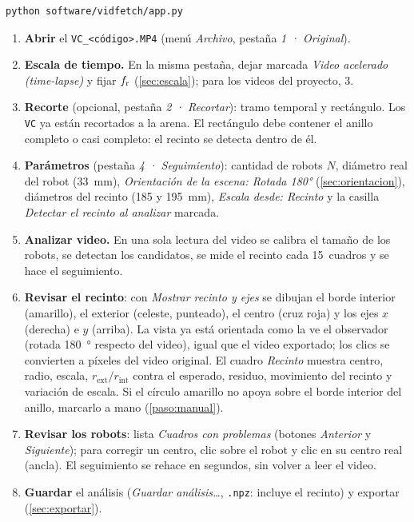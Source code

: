 \begin{verbatim}
python software/vidfetch/app.py
\end{verbatim}
\begin{enumerate}
  \item \textbf{Abrir} el \texttt{VC\_<código>.MP4} (menú \emph{Archivo}, pestaña \emph{1 · Original}).
  \item \textbf{Escala de tiempo.} En la misma pestaña, dejar marcada \emph{Video acelerado
        (time-lapse)} y fijar $f_{\mathrm{r}}$ (\cref{sec:escala}); para los videos del proyecto, 3.
  \item \textbf{Recorte} (opcional, pestaña \emph{2 · Recortar}): tramo temporal y rectángulo. Los
        \texttt{VC} ya están recortados a la arena. El rectángulo debe contener el anillo completo o casi
        completo: el recinto se detecta dentro de él.
  \item \textbf{Parámetros} (pestaña \emph{4 · Seguimiento}): cantidad de robots $N$, diámetro real del
        robot (\SI{33}{\milli\metre}), \emph{Orientación de la escena: Rotada 180°} (\cref{sec:orientacion}), diámetros del recinto
        (\SI{185}{} y \SI{195}{\milli\metre}), \emph{Escala desde: Recinto} y la casilla \emph{Detectar
        el recinto al analizar} marcada.
  \item \textbf{Analizar video.} En una sola lectura del video se calibra el tamaño de los robots, se
        detectan los candidatos, se mide el recinto cada \num{15}~cuadros y se hace el seguimiento.
  \item \textbf{Revisar el recinto}: con \emph{Mostrar recinto y ejes} se dibujan el borde interior
        (amarillo), el exterior (celeste, punteado), el centro (cruz roja) y los ejes $x$ (derecha) e $y$
        (arriba). La vista ya está orientada como la ve el observador (rotada \SI{180}{\degree} respecto del
        video), igual que el video exportado; los clics se convierten a píxeles del video original. El cuadro
        \emph{Recinto} muestra centro, radio, escala, $r_{\mathrm{ext}}/r_{\mathrm{int}}$ contra el
        esperado, residuo, movimiento del recinto y variación de escala. Si el círculo amarillo no apoya
        sobre el borde interior del anillo, marcarlo a mano (\cref{paso:manual}).
  \item \textbf{Revisar los robots}: lista \emph{Cuadros con problemas} (botones \emph{Anterior} y
        \emph{Siguiente}); para corregir un centro, clic sobre el robot y clic en su centro real (ancla).
        El seguimiento se rehace en segundos, sin volver a leer el video.
  \item \textbf{Guardar} el análisis (\emph{Guardar análisis\ldots}, \texttt{.npz}: incluye el recinto) y
        exportar (\cref{sec:exportar}).
\end{enumerate}

